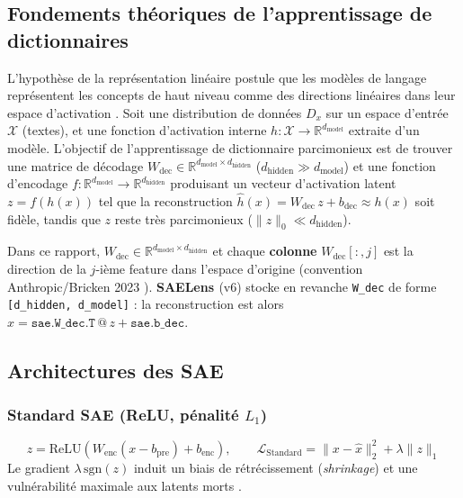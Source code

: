 \documentclass[11pt]{article}
\begin{document}
\subsection{Fondements théoriques de l'apprentissage de dictionnaires}

L'hypothèse de la représentation linéaire postule que les modèles de langage
représentent les concepts de haut niveau comme des directions linéaires dans
leur espace d'activation \cite{elhage2022superposition}. Soit une distribution
de données $D_x$ sur un espace d'entrée $\mathcal{X}$ (textes), et une
fonction d'activation interne $h : \mathcal{X} \rightarrow \mathbb{R}^{d_\text{model}}$
extraite d'un modèle. L'objectif de l'apprentissage de dictionnaire
parcimonieux est de trouver une matrice de décodage
$W_\text{dec} \in \mathbb{R}^{d_\text{model} \times d_\text{hidden}}$
($d_\text{hidden} \gg d_\text{model}$) et une fonction d'encodage
$f : \mathbb{R}^{d_\text{model}} \rightarrow \mathbb{R}^{d_\text{hidden}}$
produisant un vecteur d'activation latent $z = f(h(x))$ tel que la
reconstruction $\hat{h}(x) = W_\text{dec}\, z + b_\text{dec} \approx h(x)$ soit
fidèle, tandis que $z$ reste très parcimonieux ($\|z\|_0 \ll d_\text{hidden}$).

\begin{definitionbox}
Dans ce rapport, $W_\text{dec} \in \mathbb{R}^{d_\text{model} \times d_\text{hidden}}$
et chaque \textbf{colonne} $W_\text{dec}[:,j]$ est la direction de la $j$-ième
feature dans l'espace d'origine (convention Anthropic/Bricken 2023
\cite{bricken2023monosemanticity}). \textbf{SAELens \cite{bloom2024saelens}} (v6) stocke en revanche
\texttt{W\_dec} de forme \texttt{[d\_hidden, d\_model]} : la reconstruction est
alors $\hat{x} = \texttt{sae.W\_dec.T} \mathbin{@} z + \texttt{sae.b\_dec}$.
\end{definitionbox}

\subsection{Architectures des SAE}

\subsubsection{Standard SAE (ReLU, pénalité $L_1$)}
\[
  z = \text{ReLU}(W_\text{enc}(x - b_\text{pre}) + b_\text{enc}), \qquad
  \mathcal{L}_\text{Standard} = \|x - \hat{x}\|_2^2 + \lambda \|z\|_1
\]
Le gradient $\lambda\,\text{sgn}(z)$ induit un biais de rétrécissement
(\emph{shrinkage}) et une vulnérabilité maximale aux latents morts
\cite{cunningham2023sparse}.
\end{document}
